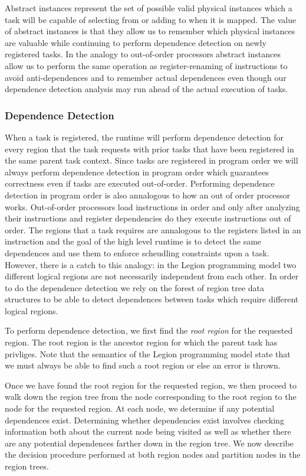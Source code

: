 Abstract instances represent the set of possible valid physical instances which a
task will be capable of selecting from or adding to when it is mapped.  The value
of abstract instances is that they allow us to remember which physical instances
are valuable while continuing to perform dependence detection on newly registered
tasks.  In the analogy to out-of-order processors abstract instances allow us
to perform the same operation as register-renaming of instructions to avoid
anti-dependences and to remember actual dependences even though our dependence detection
analysis may run ahead of the actual execution of tasks.

\subsubsection{Dependence Detection}
\label{subsec:depdetect}
When a task is registered, the runtime
will perform dependence detection for every region that the task requests with
prior tasks that have been registered in the same parent task context.  Since
tasks are registered in program order we will always perform dependence detection
in program order which guarantees correctness even if tasks are executed out-of-order.  
Performing dependence detection in program order is also annalogous to how an out of order
processor works.  Out-of-order processors load instructions in order and only after
analyzing their instructions and register dependencies do they execute instructions
out of order.  The regions that a task requires are annalogous
to the registers listed in an instruction and the goal of the high level
runtime is to detect the same dependences and use them to enforce scheudling constraints
upon a task.  However, there is a catch to this analogy: in the Legion programming
model two different logical regions are not necessarily independent from each other.  In
order to do the dependence detection we rely on the forest of region tree data structures to be
able to detect dependences between tasks which require different logical regions.

To perform dependence detection, we first find the {\em root region} for the 
requested region.  The root region is the ancestor region for which the parent task
has privliges.  Note that the semantics of the Legion programming model state that
we must always be able to find such a root region or else an error is thrown.  

Once we have found the root region for the requested region, we then proceed to walk
down the region tree from the node corresponding to the root region to the node
for the requested region.  At each node, we determine if any potential dependences exist.
Determining whether dependencies exist involves checking information both about the current
node being visited as well as whether there are any potential dependences farther down
in the region tree.  We now describe the decision procedure performed at both region
nodes and partition nodes in the region trees.

